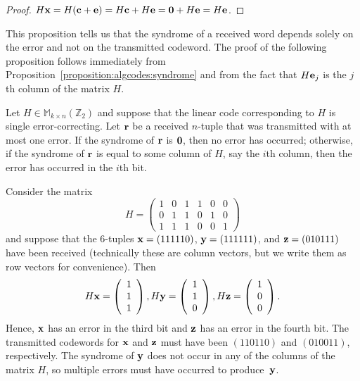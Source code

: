  \begin{proof}
$H{\bold x} = H({\bold c} +{\bold e}) = H{\bold c} + H{\bold e} =
{\bold 0} + H{\bold e} = H{\bold e}$.  
\end{proof}
 
 
This proposition tells us that the syndrome of a received word depends
solely on the error and not on the transmitted codeword. The proof of the
following proposition follows immediately from Proposition~\ref{proposition:algcodes:syndrome} and from
the fact that $H{\bold e}_j$ is the $j$th column of the matrix $H$.
 
 \begin{prop}{}
Let $H \in \mathbb{M}_{ k \times n} ( \mathbb{Z}_2)$ and suppose that the
linear code corresponding to $H$ is single error-correcting. Let
${\bold r}$ be a received $n$-tuple that was transmitted with at most
one error. If the syndrome of ${\bold r}$ is ${\bold 0}$, then no
error has occurred; otherwise, if the syndrome of ${\bold r}$ is equal
to some column of $H$, say the $i$th column, then the error has
occurred in the $i$th bit.  
\end{prop}
 
 \begin{example}{}
Consider the matrix
\[
H =
\left(
\begin{array}{cccccc}
1 & 0 & 1 & 1 & 0 & 0 \\
0 & 1 & 1 & 0 & 1 & 0 \\
1 & 1 & 1 & 0 & 0 & 1
\end{array}
\right)
\]
and suppose that the  6-tuples ${\bold x} = (111110)$,
${\bold y} = (111111)$, and ${\bold z} = (010111)$
have been received (technically these are column vectors, but we write them as row vectors for convenience). Then  
\[
H{\bold x} =
\left(
\begin{array}{c} 1 \\ 1 \\ 1 \end{array}
\right),
H{\bold y} =
\left(
\begin{array}{c} 1 \\ 1 \\ 0 \end{array}
\right),
H{\bold z} =
\left(
\begin{array}{c} 1 \\ 0 \\ 0 \end{array}
\right).
\]
Hence, ${\bold x}$ has an error in the third bit and ${\bold z}$ has
an error in the fourth bit. The transmitted codewords for ${\bold x}$
and ${\bold z}$ must have been $(110110)$ and $(010011)$,
respectively. The syndrome of ${\bold y}$ does not occur in any of the
columns of the matrix $H$, so multiple
errors must have occurred to produce~${\bold y}$.
\end{example}
 
